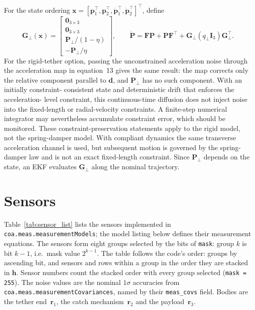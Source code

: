 \documentclass[]{article}
\newcommand{\x}{\bm{x}}
\newcommand{\Pm}{\mathbf{P}}
\newcommand{\Fm}{\mathbf{F}}
\newcommand{\Gm}{\mathbf{G}}
\begin{document}
For the state ordering
$\x=[\mathbf{p}_1^\top,\mathbf{p}_2^\top,
\dot{\mathbf{p}}_1^\top,\dot{\mathbf{p}}_2^\top]^\top$, define
\begin{equation}
  \Gm_\perp(\x)=
  \begin{bmatrix}
    \mathbf{0}_{3\times3}\\
    \mathbf{0}_{3\times3}\\
    \mathbf{P}_\perp/(1-\eta)\\
    -\mathbf{P}_\perp/\eta
  \end{bmatrix},\qquad
  \dot{\Pm}=\Fm\Pm+\Pm\Fm^\top
    +\Gm_\perp(q_\perp\mathbf{I}_3)\Gm_\perp^\top.
\end{equation}
For the rigid-tether option, passing the unconstrained acceleration noise
through the acceleration map in equation~13 gives the same result:
the map corrects only the relative component parallel to $\mathbf{d}$, and
$\mathbf{P}_\perp$ has no such component. With an initially constraint-
consistent state and deterministic drift that enforces the acceleration-
level constraint, this continuous-time diffusion does not inject noise into
the fixed-length or radial-velocity constraints. A finite-step numerical
integrator may nevertheless accumulate constraint error, which should be
monitored. These constraint-preservation statements apply to the rigid
model, not the spring-damper model. With compliant dynamics the same
transverse acceleration channel is used, but subsequent motion is governed by
the spring-damper law and is not an exact fixed-length constraint. Since
$\mathbf{P}_\perp$ depends on the state, an EKF evaluates $\Gm_\perp$ along
the nominal trajectory.

\section{Sensors}\label{sec:sensors}

Table~\ref{tab:sensor_list} lists the sensors implemented in
\texttt{coa.meas.measurementModels}; the model listing below defines their
measurement equations. The sensors form eight groups selected by the bits of
\texttt{mask}: group $k$ is bit $k-1$, i.e.\ mask value $2^{k-1}$. The table
follows the code's order: groups by ascending bit, and sensors and rows within
a group in the order they are stacked in $\bm{h}$. Sensor numbers count the
stacked order with every group selected (\texttt{mask = 255}). The noise
values are the nominal $1\sigma$ accuracies from
\texttt{coa.meas.measurementCovariances}, named by their \texttt{meas\_covs}
field. Bodies are the tether end~$\mathbf{r}_1$, the catch
mechanism~$\mathbf{r}_2$ and the payload~$\mathbf{r}_3$.
\end{document}
